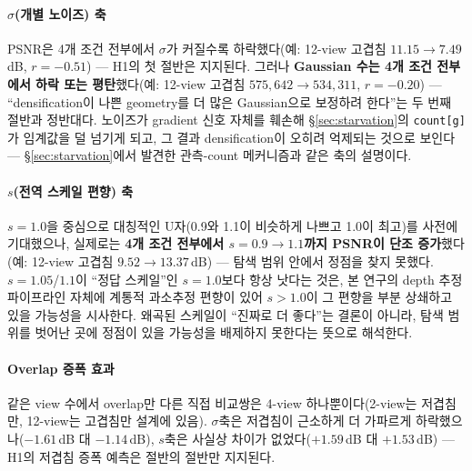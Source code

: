 \paragraph{$\sigma$(개별 노이즈) 축} PSNR은 4개 조건 전부에서 $\sigma$가 커질수록 하락했다(예: 12-view 고겹침 $11.15 \to 7.49\,$dB, $r=-0.51$) — H1의 첫 절반은 지지된다. 그러나 \textbf{Gaussian 수는 4개 조건 전부에서 하락 또는 평탄}했다(예: 12-view 고겹침 $575{,}642 \to 534{,}311$, $r=-0.20$) — ``densification이 나쁜 geometry를 더 많은 Gaussian으로 보정하려 한다''는 두 번째 절반과 정반대다. 노이즈가 gradient 신호 자체를 훼손해 \S\ref{sec:starvation}의 \texttt{count[g]}가 임계값을 덜 넘기게 되고, 그 결과 densification이 오히려 억제되는 것으로 보인다 — \S\ref{sec:starvation}에서 발견한 관측-count 메커니즘과 같은 축의 설명이다.

\paragraph{$s$(전역 스케일 편향) 축} $s=1.0$을 중심으로 대칭적인 U자(0.9와 1.1이 비슷하게 나쁘고 1.0이 최고)를 사전에 기대했으나, 실제로는 \textbf{4개 조건 전부에서 $s=0.9\to1.1$까지 PSNR이 단조 증가}했다(예: 12-view 고겹침 $9.52\to13.37\,$dB) — 탐색 범위 안에서 정점을 찾지 못했다. $s=1.05$/$1.1$이 ``정답 스케일''인 $s=1.0$보다 항상 낫다는 것은, 본 연구의 depth 추정 파이프라인 자체에 계통적 과소추정 편향이 있어 $s>1.0$이 그 편향을 부분 상쇄하고 있을 가능성을 시사한다. 왜곡된 스케일이 ``진짜로 더 좋다''는 결론이 아니라, 탐색 범위를 벗어난 곳에 정점이 있을 가능성을 배제하지 못한다는 뜻으로 해석한다.

\paragraph{Overlap 증폭 효과} 같은 view 수에서 overlap만 다른 직접 비교쌍은 4-view 하나뿐이다(2-view는 저겹침만, 12-view는 고겹침만 설계에 있음). $\sigma$축은 저겹침이 근소하게 더 가파르게 하락했으나($-1.61\,$dB 대 $-1.14\,$dB), $s$축은 사실상 차이가 없었다($+1.59\,$dB 대 $+1.53\,$dB) — H1의 저겹침 증폭 예측은 절반의 절반만 지지된다.

